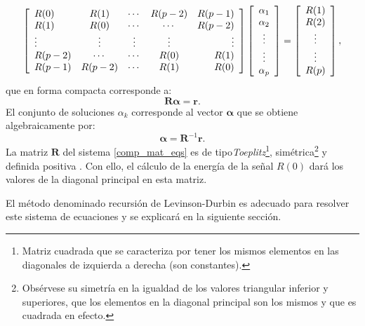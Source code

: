 \begin{equation}
\left[
\begin{array}{l c c c r}
R(0) 		& R(1) 	& \cdots & R(p-2) & R(p-1) \\
R(1) 		& R(0) 	& \cdots & \cdots & R(p-2) \\
\vdots 	& \vdots 	& \vdots & \vdots & \vdots \\
R(p-2) 	& \cdots 	& \cdots & R(0) & R(1) \\
R(p-1) 	& R(p-2) 	& \cdots & R(1) & R(0) \\
\end{array} \right] 
\left[\begin{array}{c}
\alpha_1 \\
\alpha_2 \\
\vdots \\
\vdots \\
\alpha_p \\
\end{array} \right]=
\left[\begin{array}{c}
R(1) \\
R(2) \\
\vdots \\
\vdots \\
R(p) \\
\end{array} \right],
\label{mat_eqs}
\end{equation}
que en forma compacta corresponde a:
\begin{equation}\label{comp_mat_eqs}
\mathbf{R}\mathbf{\alpha}=\mathbf{r}.
\end{equation}
El conjunto de soluciones $\alpha_k$ corresponde al vector $\mathbf{\alpha}$ que se obtiene algebraicamente por:
$$\mathbf{\alpha} = \mathbf{R}^{-1} \mathbf{r}.$$
La matriz $\mathbf{R}$ del sistema \eqref{comp_mat_eqs} es de tipo\emph{Toeplitz}\footnote{Matriz cuadrada que se caracteriza por tener los mismos elementos en las diagonales de izquierda a derecha (son constantes).}, simétrica\footnote{Obsérvese su simetría en la igualdad de los valores triangular inferior y superiores, que los elementos en la diagonal principal son los mismos y que es cuadrada en efecto.} y definida positiva \cite[]{Gray2006}. Con ello, el cálculo de la energía de la señal $R(0)$ dará los valores de la diagonal principal en esta matriz. 

El método denominado recursión de Levinson-Durbin es adecuado para resolver este sistema de ecuaciones y se explicará en la siguiente sección.
